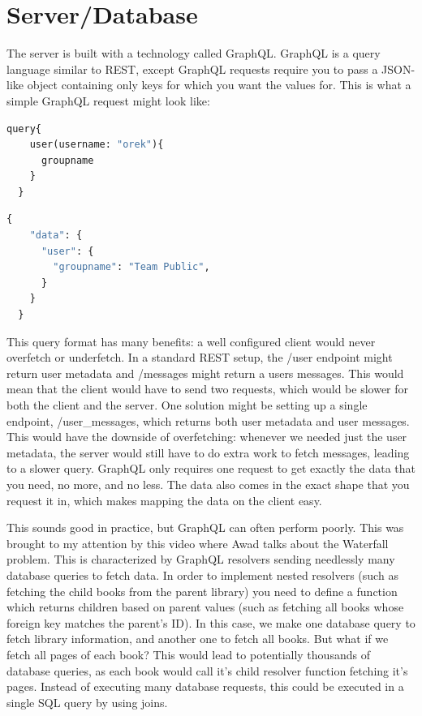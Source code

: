 \documentclass{l4proj}
\begin{document}
\section{Server/Database}

The server is built with a technology called GraphQL. GraphQL is a query language similar to REST, except GraphQL requests require you to pass a JSON-like object containing only keys for which you want the values for. This is what a simple GraphQL request might look like: 

\begin{lstlisting}[language=python, caption={An example GraphQL query fetching a user's group}, label=lst:callahan]
  query{
    user(username: "orek"){
      groupname
    }
  }
\end{lstlisting}

\begin{lstlisting}[language=python, caption={Response to above query}]
  {
    "data": {
      "user": {
        "groupname": "Team Public",
      }
    }
  }
\end{lstlisting}
This query format has many benefits: a well configured client would never overfetch or underfetch. In a standard REST setup, the /user endpoint might return user metadata and /messages might return a users messages. This would mean that the client would have to send two requests, which would be slower for both the client and the server. One solution might be setting up a single endpoint, /user\_messages, which returns both user metadata and user messages. This would have the downside of overfetching: whenever we needed just the user metadata, the server would still have to do extra work to fetch messages, leading to a slower query. GraphQL only requires one request to get exactly the data that you need, no more, and no less. The data also comes in the exact shape that you request it in, which makes mapping the data on the client easy. 

This sounds good in practice, but GraphQL can often perform poorly. This was brought to my attention by this video where Awad talks about the Waterfall problem. This is characterized by GraphQL resolvers sending needlessly many database queries to fetch data. In order to implement nested resolvers (such as fetching the child books from the parent library) you need to define a function which returns children based on parent values (such as fetching all books whose foreign key matches the parent's ID). In this case, we make one database query to fetch library information, and another one to fetch all books. But what if we fetch all pages of each book? This would lead to potentially thousands of database queries, as each book would call it's child resolver function fetching it's pages. Instead of executing many database requests, this could be executed in a single SQL query by using joins.
\end{document}

